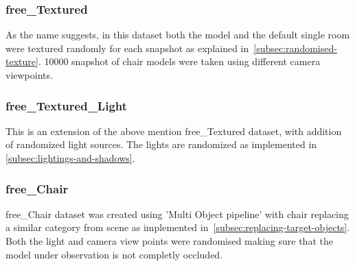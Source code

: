 \subsubsection{\Gls{free}\_Textured}

    As the name suggests, in this dataset both the model and the default single room were textured randomly for each snapshot as explained in~\ref{subsec:randomised-texture}.
    10000 snapshot of chair models were taken using different camera viewpoints.

\subsubsection{\Gls{free}\_Textured\_Light}

    This is an extension of the above mention \gls{free}\_Textured dataset, with addition of randomized light sources.
    The lights are randomized as implemented in \autoref{subsec:lightings-and-shadows}.

\subsubsection{\gls{free}\_Chair}

    \Gls{free}\_Chair dataset was created using 'Multi Object pipeline' with chair replacing a similar category from scene as implemented in~\ref{subsec:replacing-target-objects}.
    Both the light and camera view points were randomised making sure that the model under observation is not completly occluded.


